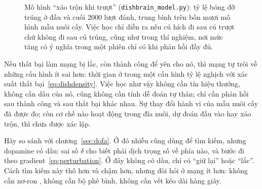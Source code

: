 \begin{figure}[t]
\centering
{}
\caption{Mô hình ``xáo trộn khi trượt'' (\texttt{dishbrain\_model.py}): tỷ lệ bóng đỡ trúng ở đầu và cuối $2000$ lượt đánh, trung bình trên bốn mươi mô hình mẫu nuôi cấy. Việc học chỉ diễn ra nếu cú hích đi sau cú trượt chứ không đi sau cú trúng, cũng như trong thí nghiệm, nơi mức tăng có ý nghĩa trong một phiên chỉ có khi phản hồi đầy đủ.}
\label{fig:dishmodel}
\end{figure}

\begin{keyblock}
\begin{proposition}
\label{prop:dishscramble}
Nếu thất bại làm mạng bị lắc, còn thành công để yên cho nó, thì mạng tự trôi về những cấu hình ít sai hơn: thời gian ở trong một cấu hình tỷ lệ nghịch với xác suất thất bại~\eqref{eq:dishdensity}. Việc học như vậy không cần tín hiệu thưởng, không cần dấu của nó, cũng không cần tính dễ đoán tự thân; chỉ cần phản hồi sau thành công và sau thất bại khác nhau. Sự thay đổi hành vi của mẫu nuôi cấy đã được đo; còn cơ chế nào hoạt động trong đĩa nuôi, dự đoán đầu vào hay xáo trộn, thì chưa được xác lập.
\end{proposition}
\end{keyblock}

Hãy so sánh với chương~\ref{sec:dofa}. Ở đó nhiễu cũng dùng để tìm kiếm, nhưng dopamine có dấu: sai số $\delta$ cho biết phải dịch trọng số về phía nào, và bước đi theo gradient~\eqref{eq:perturbation}. Ở đây không có dấu, chỉ có ``giữ lại'' hoặc ``lắc''. Cách tìm kiếm này thô hơn và chậm hơn, nhưng đòi hỏi ở mạng ít hơn: không cần nơ-ron , không cần bộ phê bình, không cần vết kéo dài hàng giây.

